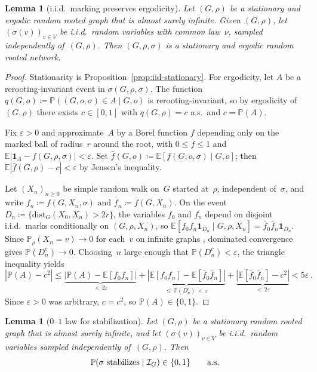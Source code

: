 \documentclass[11pt]{amsart}
\theoremstyle{plain}
\newtheorem{lemma}[theorem]{Lemma}
\theoremstyle{definition}
\newcommand{\E}{\mathbb{E}}
\renewcommand{\P}{\mathbb{P}}
\newcommand{\eps}{\varepsilon}
\newcommand{\one}{\mathbf{1}}
\begin{document}
	\begin{lemma}[i.i.d.\ marking preserves ergodicity]\label{lem:ergodic-marked-stationary}
		Let $(G,\rho)$ be a stationary and ergodic random rooted graph that is almost surely infinite. Given $(G,\rho)$, let $(\sigma(v))_{v\in V}$ be i.i.d.\ random variables with common law~$\nu$, sampled independently of~$(G,\rho)$. Then $(G,\rho,\sigma)$ is a stationary and ergodic random rooted network.
	\end{lemma}
	
	\begin{proof}
		Stationarity is Proposition~\ref{prop:iid-stationary}. For ergodicity, let $A$ be a rerooting-invariant event in $\sigma(G,\rho,\sigma)$. The function $q(G,o)\coloneqq\P((G,o,\sigma)\in A\mid G,o)$ is rerooting-invariant, so by ergodicity of~$(G,\rho)$ there exists $c\in[0,1]$ with $q(G,\rho)=c$ a.s.\ and $c=\P(A)$.
		
		Fix $\eps>0$ and approximate~$A$ by a Borel function $f$ depending only on the marked ball of radius~$r$ around the root, with $0\leq f\leq 1$ and $\E|\one_A-f(G,\rho,\sigma)|<\eps$. Set $\bar{f}(G,o)\coloneqq\E[f(G,o,\sigma)\mid G,o]$; then $\E|\bar{f}(G,\rho)-c|<\eps$ by Jensen's inequality.
		
		Let $(X_n)_{n\geq 0}$ be simple random walk on~$G$ started at~$\rho$, independent of~$\sigma$, and write $f_n\coloneqq f(G,X_n,\sigma)$ and $\bar{f}_n\coloneqq\bar{f}(G,X_n)$. On the event $D_n\coloneqq\{\mathrm{dist}_G(X_0,X_n)>2r\}$, the variables $f_0$ and $f_n$ depend on disjoint i.i.d.\ marks conditionally on $(G,\rho,X_n)$, so $\E[f_0 f_n\one_{D_n}\mid G,\rho,X_n]=\bar{f}_0\bar{f}_n\one_{D_n}$. Since $\P_\rho(X_n=v)\to 0$ for each~$v$ on infinite graphs \citep[Exercise~2.1(f)]{LP16}, dominated convergence gives $\P(D_n^c)\to 0$. Choosing~$n$ large enough that $\P(D_n^c)<\eps$, the triangle inequality yields
		\[
		|\P(A)-c^2|
		\leq\underbrace{|\P(A)-\E[f_0 f_n]|}_{<\,2\eps}
		+\underbrace{|\E[f_0 f_n]-\E[\bar{f}_0\bar{f}_n]|}_{\leq\,\P(D_n^c)\,<\,\eps}
		+\underbrace{|\E[\bar{f}_0\bar{f}_n]-c^2|}_{<\,2\eps}<5\eps\,.
		\]
		Since $\eps>0$ was arbitrary, $c=c^2$, so $\P(A)\in\{0,1\}$.
	\end{proof}
	
	\begin{lemma}[$0$--$1$ law for stabilization]\label{lem:01-stationary}
		Let $(G,\rho)$ be a stationary random rooted graph that is almost surely infinite, and let $(\sigma(v))_{v\in V}$ be i.i.d.\ random variables sampled independently of~$(G,\rho)$. Then
		\[
		\P(\sigma\textup{ stabilizes}\mid\mathcal{I}_G)\in\{0,1\}\qquad\text{a.s.}
		\]
	\end{lemma}
	
\end{document}
